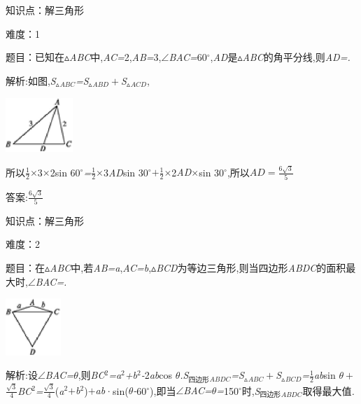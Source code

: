\documentclass{article} %
\begin{document}
知识点：解三角形

难度：1

 题目：已知在$\mathrm{\vartriangle}$\textit{ABC}中,\textit{AC=}2,\textit{AB=}3,$\mathrm{\angle}$\textit{BAC=}60$\mathrm{{}^\circ}$,\textit{AD}是$\mathrm{\vartriangle}$\textit{ABC}的角平分线,则\textit{AD=\underbar{　　　　}.~}

 解析:如图,\textit{S}${}_{\vartriangle }$\textit{${}_{ABC}$=S}${}_{\vartriangle }$\textit{${}_{ABD}+$S}${}_{\vartriangle }$\textit{${}_{ACD}$},

 \includegraphics*[width=1.00in, height=0.81in, keepaspectratio=false]{image1007}

所以$\frac{1}{2}$\textit{$\times$}3\textit{$\times$}2sin 60$\mathrm{{}^\circ}$\textit{=}$\frac{1}{2}$\textit{$\times$}3\textit{AD}sin 30$\mathrm{{}^\circ}$\textit{$+$}$\frac{1}{2}$\textit{$\times$}2\textit{AD$\times$}sin 30$\mathrm{{}^\circ}$,所以$AD=\frac{6\sqrt{3}}{5}$

 答案:$\frac{6\sqrt{3}}{5}$

知识点：解三角形

难度：2

 题目：在$\mathrm{\vartriangle}$\textit{ABC}中,若\textit{AB=a},\textit{AC=b},$\mathrm{\vartriangle}$\textit{BCD}为等边三角形,则当四边形\textit{ABDC}的面积最大时,$\mathrm{\angle}$\textit{BAC=\underbar{　　　　　}.~}

 \includegraphics*[width=0.82in, height=0.85in, keepaspectratio=false]{image1013}

 解析:设$\mathrm{\angle}$\textit{BAC=$\theta$},则\textit{BC}${}^{2}$\textit{=a}${}^{2}$\textit{+b}${}^{2}$\textit{-}2\textit{ab}cos \textit{$\theta$.S}${}_{\textrm{四}\textrm{边}\textrm{形}}$\textit{${}_{ABDC}$=S}${}_{\vartriangle }$\textit{${}_{ABC}+$S}${}_{\vartriangle }$\textit{${}_{BCD}$=}$\frac{1}{2}$\textit{ab}sin \textit{$\theta+$}$\frac{\sqrt{3}}{4}$\textit{BC}${}^{2}$\textit{=}$\frac{\sqrt{3}}{4}$(\textit{a}${}^{2}$\textit{$+$b}${}^{2}$)\textit{$+$ab}·sin(\textit{$\theta$-}60$\mathrm{{}^\circ}$),即当$\mathrm{\angle}$\textit{BAC=$\theta$=}150$\mathrm{{}^\circ}$时,\textit{S}${}_{\textrm{四}\textrm{边}\textrm{形}}$\textit{${}_{ABDC}$}取得最大值\textit{.}
\end{document}
